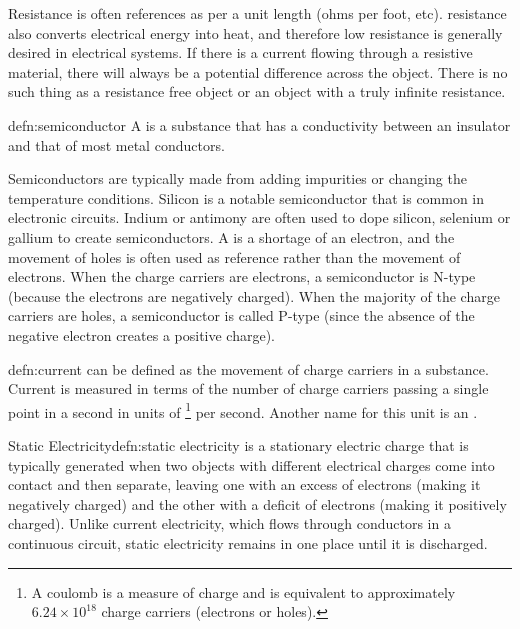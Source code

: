 Resistance is often references as per a unit length (ohms per foot, etc). resistance also converts electrical energy into heat, and therefore low resistance is generally desired in electrical systems. If there is a current flowing through a resistive material, there will always be a potential difference across the object. There is no such thing as a resistance free object or an object with a truly infinite resistance.

\begin{defn}[Semiconductor]{defn:semiconductor}
A  is a substance that has a conductivity between an insulator and that of most metal conductors.
\end{defn}

Semiconductors are typically made from adding impurities or changing the temperature conditions. Silicon is a notable semiconductor that is common in electronic circuits. Indium or antimony are often used to dope silicon, selenium or gallium to create semiconductors. A  is a shortage of an electron, and the movement of holes is often used as reference rather than the movement of electrons. When the charge carriers are electrons, a semiconductor is N-type (because the electrons are negatively charged). When the majority of the charge carriers are holes, a semiconductor is called P-type (since the absence of the negative electron creates a positive charge).

\begin{defn}[Current]{defn:current}
 can be defined as the movement of charge carriers in a substance. Current is measured in terms of the number of charge carriers passing a single point in a second in units of \footnote{A coulomb is a measure of charge and is equivalent to approximately $6.24 \times 10^{18}$ charge carriers (electrons or holes).} per second. Another name for this unit is an .
\end{defn}

\begin{defn}{Static Electricity}{defn:static electricity}
 is a stationary electric charge that is typically generated when two objects with different electrical charges come into contact and then separate, leaving one with an excess of electrons (making it negatively charged) and the other with a deficit of electrons (making it positively charged). Unlike current electricity, which flows through conductors in a continuous circuit, static electricity remains in one place until it is discharged.
\end{defn}

